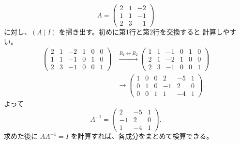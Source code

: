 \begin{example}[逆行列の計算]
\[
 A=\begin{pmatrix}2&1&-2\\1&1&-1\\2&3&-1\end{pmatrix}
\]
に対し、$(A\mid I)$ を掃き出す。初めに第1行と第2行を交換すると
計算しやすい。
\begin{align*}
\left(\begin{array}{ccc|ccc}2&1&-2&1&0&0\\1&1&-1&0&1&0\\2&3&-1&0&0&1\end{array}\right)
&\xrightarrow{R_1\leftrightarrow R_2}
\left(\begin{array}{ccc|ccc}1&1&-1&0&1&0\\2&1&-2&1&0&0\\2&3&-1&0&0&1\end{array}\right)\\
&\longrightarrow
\left(\begin{array}{ccc|ccc}1&0&0&2&-5&1\\0&1&0&-1&2&0\\0&0&1&1&-4&1\end{array}\right).
\end{align*}
よって
\begin{equation}
 \boxed{A^{-1}=\begin{pmatrix}2&-5&1\\-1&2&0\\1&-4&1\end{pmatrix}}.
\end{equation}
求めた後に $AA^{-1}=I$ を計算すれば、各成分をまとめて検算できる。
\end{example}
